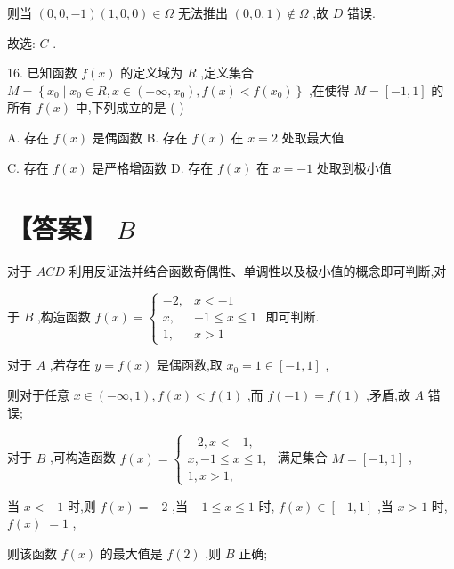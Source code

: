 \documentclass[10pt]{article}
\begin{document}
则当 \(\left( {0,0, - 1}\right) \left( {1,0,0}\right)  \in  \Omega\) 无法推出 \(\left( {0,0,1}\right)  \notin  \Omega\) ,故 \(D\) 错误.

故选: \(C\) .

16. 已知函数 \(f\left( x\right)\) 的定义域为 \(R\) ,定义集合 \(M = \left\{  {{x}_{0} \mid  {x}_{0} \in  R,x \in  \left( {-\infty ,{x}_{0}}\right) ,f\left( x\right)  < f\left( {x}_{0}\right) }\right\}\) ,在使得 \(M = \left\lbrack  {-1,1}\right\rbrack\) 的所有 \(f\left( x\right)\) 中,下列成立的是 ( )

A. 存在 \(f\left( x\right)\) 是偶函数 B. 存在 \(f\left( x\right)\) 在 \(x = 2\) 处取最大值

C. 存在 \(f\left( x\right)\) 是严格增函数 D. 存在 \(f\left( x\right)\) 在 \(x =  - 1\) 处取到极小值

\section*{【答案】 \(B\)}

对于 \({ACD}\) 利用反证法并结合函数奇偶性、单调性以及极小值的概念即可判断,对

于 \(B\) ,构造函数 \(f\left( x\right)  = \left\{  \begin{array}{ll}  - 2, & x <  - 1 \\  x, &  - 1 \leq  x \leq  1 \\  1, & x > 1 \end{array}\right.\) 即可判断.

对于 \(A\) ,若存在 \(y = f\left( x\right)\) 是偶函数,取 \({x}_{0} = 1 \in  \left\lbrack  {-1,1}\right\rbrack\) ,

则对于任意 \(x \in  \left( {-\infty ,1}\right) ,f\left( x\right)  < f\left( 1\right)\) ,而 \(f\left( {-1}\right)  = f\left( 1\right)\) ,矛盾,故 \(A\) 错误;

对于 \(B\) ,可构造函数 \(f\left( x\right)  = \left\{  \begin{array}{l}  - 2,x <  - 1, \\  x, - 1 \leq  x \leq  1, \\  1,x > 1, \end{array}\right.\) 满足集合 \(M = \left\lbrack  {-1,1}\right\rbrack\) ,

当 \(x <  - 1\) 时,则 \(f\left( x\right)  =  - 2\) ,当 \(- 1 \leq  x \leq  1\) 时, \(f\left( x\right)  \in  \left\lbrack  {-1,1}\right\rbrack\) ,当 \(x > 1\) 时, \(f\left( x\right) \; = 1\) ,

则该函数 \(f\left( x\right)\) 的最大值是 \(f\left( 2\right)\) ,则 \(B\) 正确;
\end{document}
